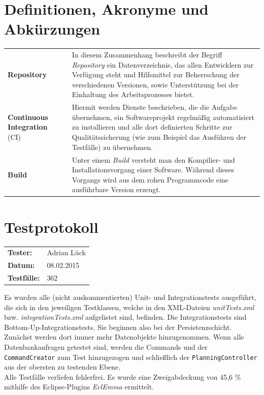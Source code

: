 \documentclass[fontsize=12pt,paper=a4,twoside]{scrartcl}
\renewcommand{\arraystretch}{1.2}
\begin{document}

\newpage

  \thispagestyle{fancy}
  \fancyhead{}
  \fancyfoot{}
  \renewcommand{\headrulewidth}{0.4pt}

\section{Definitionen, Akronyme und Abkürzungen}
\renewcommand{\arraystretch}{2}
\begin{tabularx}{\textwidth}{Xp{1cm}p{9.5cm}}
\textbf{Repository} & & In diesem Zusammenhang beschreibt der Begriff \textit{Repository} ein Datenverzeichnis, das allen Entwicklern zur Verfügung steht und Hilfsmittel zur Beherrschung der verschiedenen Versionen, sowie Unterstützung bei der Einhaltung des Arbeitsprozesses bietet.\\
\textbf{Continuous Integration} (CI) & & Hiermit werden Dienste beschrieben, die die Aufgabe übernehmen, ein Softwareprojekt regelmäßig automatisiert zu installieren und alle dort definierten Schritte zur Qualitätssicherung (wie zum Beispiel das Ausführen der Testfälle) zu übernehmen. \\
\textbf{Build} & & Unter einem \textit{Build} versteht man den Kompilier- und Installationsvorgang einer Software. Während dieses Vorgangs wird aus dem rohen Programmcode eine ausführbare Version erzeugt. \\
\end{tabularx}

\section{Testprotokoll}

\begin{tabular}{ll}
\textbf{Tester:} & Adrian Lück\\
\textbf{Datum:} & 08.02.2015\\
\textbf{Testfälle:} & 362 
\end{tabular}

Es wurden alle (nicht auskommentierten) Unit- und Integrationstests ausgeführt, die sich in den jeweiligen Testklassen, welche in den XML-Dateien \textit{unitTests.xml} bzw. \textit{integrationTests.xml} aufgelistet sind, befinden. Die Integrationstests sind Bottom-Up-Integrationstests. Sie beginnen also bei der Persistenzschicht. Zunächst werden dort immer mehr Datenobjekte hinzugenommen. Wenn alle Datenbankanfragen getestet sind, werden die Commands und der \texttt{CommandCreator} zum Test hinzugezogen und schließlich der \texttt{PlanningController} aus der obersten zu testenden Ebene. \\
Alle Testfälle verliefen fehlerfrei. Es wurde eine Zweigabdeckung von 45,6 \% mithilfe des Eclipse-Plugins \textit{EclEmma} ermittelt.\\
\newpage
\end{document}
